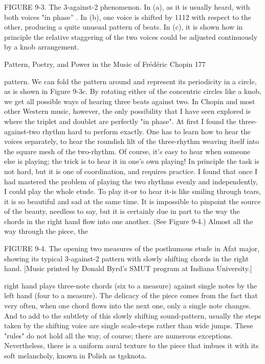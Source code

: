 FIGURE 9-3. The 3-against-2 phenomenon. In (a), as it is usually heard, with both voices
"in phase'' . In (b), one voice is shifted by 1112 with respect to the other, producing a
quite unusual pattern of beats. In (c), it is shown how in principle the relative staggering
of the two voices could be adjusted continuously by a knob arrangement.




Pattern, Poetry, and Power in the Music of Frédéric Chopin                               177

    pattern. We can fold the pattern around and represent its periodicity in a circle, as is
  shown in Figure 9-3c. By rotating either of the concentric circles like a knob, we get all
    possible ways of hearing three beats against two. In Chopin and most other Western
   music, however, the only possibility that I have seen explored is where the triplet and
                               doublet are perfectly "in phase".
At first I found the three-against-two rhythm hard to perform exactly. One has to learn
how to hear the voices separately, to hear the roundish lilt of the three-rhythm weaving
itself into the square mesh of the two-rhythm. Of course, it's easy to hear when someone
else is playing; the trick is to hear it in one's own playing! In principle the task is not
hard, but it is one of coordination, and requires practice. I found that once I had mastered
the problem of playing the two rhythms evenly and independently, I could play the whole
etude. To play it-or to hear it-is like smiling through tears, it is so beautiful and sad at the
same time.
It is impossible to pinpoint the source of the beauty, needless to say, but it is certainly due
in part to the way the chords in the right hand flow into one another. (See Figure 9-4.)
Almost all the way through the piece, the




FIGURE 9-4. The opening two measures of the posthumous etude in Afat major, showing
its typical 3-against-2 pattern with slowly shifting chords in the right hand. [Music
printed by Donald Byrd's SMUT program at Indiana University.]

right hand plays three-note chords (six to a measure) against single notes by the left hand
(four to a measure). The delicacy of the piece comes from the fact that very often, when
one chord flows into the next one, only a single note changes. And to add to the subtlety
of this slowly shifting sound-pattern, usually the steps taken by the shifting voice are
single scale-steps rather than wide jumps. These "rules" do not hold all the way, of
course; there are numerous exceptions. Nevertheless, there is a uniform aural texture to
the piece that imbues it with its soft melancholy, known in Polish as tgsknota.

